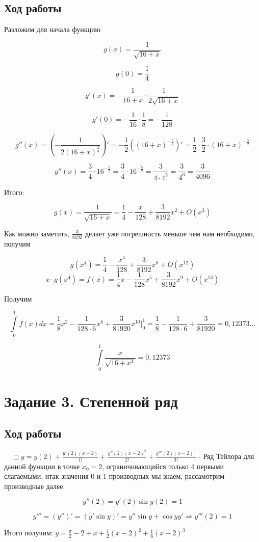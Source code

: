 \documentclass[fleqn]{article}
\begin{document}
\subsection*{Ход работы}

Разложим для начала функцию

\[
g(x) = \frac{1}{\sqrt{16+x}}
\]

\[
g(0) = \frac{1}{4}
\]

\[
g'(x) = - \frac{1}{16+x} \cdot \frac{1}{2\sqrt{16+x}}
\]

\[
g'(0) = - \frac{1}{16} \cdot \frac{1}{8} = - \frac{1}{128}
\]

\[
g''(x) = \left( -\frac{1}{2 \left( 16+x \right)^{\frac{2}{3}}} \right)' = -\frac{1}{2} \left( (16+x)^{-\frac{3}{2}}\right)' = \frac{1}{2} \cdot \frac{3}{2} \cdot (16+x)^{-\frac{5}{2}}
\]

\[
g''(x) = \frac{3}{4} \cdot 16^{-\frac{5}{2}} = \frac{3}{4} \cdot 16^{-\frac{5}{2}} = \frac{3}{4 \cdot 4^5} = \frac{3}{4^6} = \frac{3}{4096}
\]


Итого:

\[
    g(x) = \frac{1}{\sqrt{16+x}} = \frac{1}{4} - \frac{x}{128} + \frac{3}{8192} x^2 + O(x^3)
\]

Как можно заметить, $\frac{3}{8192}$ делает уже погрешность меньше чем нам необходимо, получим

\[
    g(x^4) = \frac{1}{4} - \frac{x^4}{128} + \frac{3}{8192}x^8 + O(x^{12})
    \]
\[
    x \cdot g(x^4) = f(x) = \frac{1}{4}x - \frac{1}{128}x^5 + \frac{3}{8192}x^9 + O(x^{13})
\]

Получим

\[
    \int\limits_{0}^{1}f(x)dx = \frac{1}{8}x^2 - \frac{1}{128 \cdot 6}x^6 + \frac{3}{81920}x^{10} \Big|_{0}^{1} = \frac{1}{8} - \frac{1}{128 \cdot 6} + \frac{3}{81920} = 0,12373 ...
\]

\[
\int\limits_{0}^{1} \frac{x}{\sqrt{16+x^4}} = 0,12373
\]


\section{Задание 3. Степенной ряд}

\subsection*{Ход работы}

$\quad\sqsupset y = y(2) + \frac{y'(2)(x-2)}{1!} + \frac{y''(2)(x-2)^2}{2!} + \frac{y'''(2)(x-2)^3}{3!}$ - Ряд Тейлора для данной функции в точке $x_0 = 2$, ограничивающийся только 4 первыми слагаемыми, итак значения 0 и 1 производных мы знаем, рассамотрим производные далее:

\[
    y''(2) = y'(2)\sin{y(2)} = 1
\]

\[
    y''' = (y'')' = (y'\sin{y})' = y''\sin{y} + \cos{y}y' \Rightarrow y'''(2) = 1
\]

Итого получим: $y = \frac{\pi}{2} - 2 + x + \frac{1}{2}(x-2)^2 + \frac{1}{6}(x-2)^3$
\end{document}
